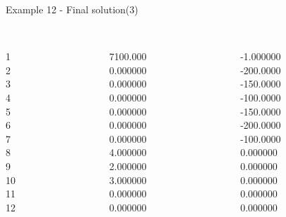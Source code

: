 \begin{frame}{Example 12 - Final solution(3)}
\footnotesize
\begin{columns}[t]
\begin{column}{0.3\textwidth}
\\
1\\
2\\
3\\
4\\
5\\
6\\
7\\
8\\
9\\
10\\
11\\
12\\
\end{column}
\begin{column}{0.3\textwidth}
\\
7100.000\\
0.000000\\
0.000000\\
0.000000\\
0.000000\\
0.000000\\
0.000000\\
4.000000\\
2.000000\\
3.000000\\
0.000000\\
0.000000\\
\end{column}  

\begin{column}{0.3\textwidth}
\\
-1.000000\\
-200.0000\\
-150.0000\\
-100.0000\\
-150.0000\\
-200.0000\\
-100.0000\\
0.000000\\
0.000000\\
0.000000\\
0.000000\\
0.000000\\
\end{column}
\end{columns}  
\end{frame}

